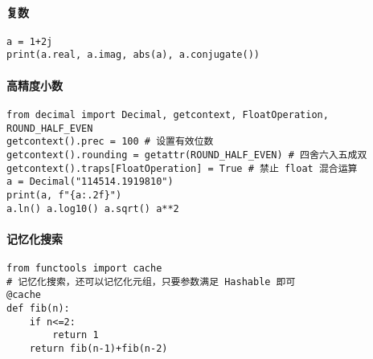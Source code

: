 \paragraph*{复数}
\begin{verbatim}
a = 1+2j
print(a.real, a.imag, abs(a), a.conjugate())
\end{verbatim}

\paragraph*{高精度小数}
\begin{verbatim}
from decimal import Decimal, getcontext, FloatOperation, ROUND_HALF_EVEN
getcontext().prec = 100 # 设置有效位数
getcontext().rounding = getattr(ROUND_HALF_EVEN) # 四舍六入五成双
getcontext().traps[FloatOperation] = True # 禁止 float 混合运算
a = Decimal("114514.1919810")
print(a, f"{a:.2f}")
a.ln() a.log10() a.sqrt() a**2
\end{verbatim}


\paragraph*{记忆化搜索}
\begin{verbatim}
from functools import cache
# 记忆化搜索，还可以记忆化元组，只要参数满足 Hashable 即可
@cache 
def fib(n):
    if n<=2:
        return 1
    return fib(n-1)+fib(n-2)
\end{verbatim}